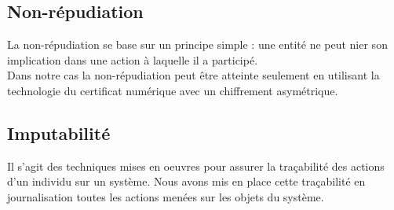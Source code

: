 \subsection{Non-répudiation}
La non-répudiation se base sur un principe simple : une entité ne peut nier
son implication dans une action à laquelle il a participé.
$ $\\Dans notre cas la non-répudiation peut être atteinte seulement en utilisant la
technologie du certificat numérique avec un chiffrement asymétrique.
\subsection{Imputabilité}
Il s’agit des techniques mises en oeuvres pour assurer la traçabilité des actions
d’un individu sur un système. Nous avons mis en place cette traçabilité en
journalisation toutes les actions menées sur les objets du système.